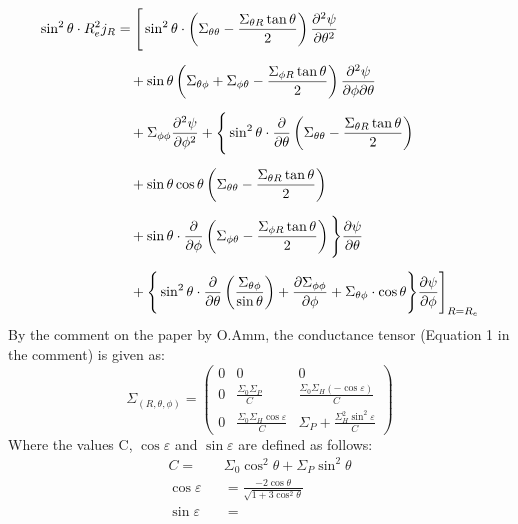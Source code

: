 \documentclass{article}
\begin{document}
\begin{equation*}
	\begin{aligned}
		\sin^2\theta \cdot R_e^2j_R
		 & =  \Bigg[
			\sin^2 \theta \cdot \left( \Sigma_{\theta\theta} - \frac{\Sigma_{\theta R} \tan\theta}{2} \right)
		\pdv[2]{\psi}{\theta}                                                         \\[6pt]
		 & \quad + \sin\theta
		\left( \Sigma_{\theta\phi} + \Sigma_{\phi\theta} - \frac{\Sigma_{\phi R} \tan\theta}{2} \right)
		\pdv{\psi}{\phi}{\theta}                                                      \\[6pt]
		 & \quad + \Sigma_{\phi\phi}
		\pdv[2]{\psi}{\phi} + \Bigg\{
		\sin^2\theta\cdot \pdv{\theta}
		\left( \Sigma_{\theta\theta} - \frac{\Sigma_{\theta R} \tan\theta}{2} \right) \\[6pt]
		 & \quad + \sin \theta\cos\theta
		\left( \Sigma_{\theta\theta} - \frac{\Sigma_{\theta R} \tan\theta}{2} \right) \\[6pt]
		 & \quad + \sin\theta\cdot
		\pdv{\phi}
		\left( \Sigma_{\phi\theta} - \frac{\Sigma_{\phi R} \tan\theta}{2} \right)
		\Bigg\}\pdv{\psi}{\theta}                                                     \\[6pt]
		 & \quad + \Bigg\{\sin^2\theta\cdot\pdv{\theta}
		\left( \frac{\Sigma_{\theta\phi}}{\sin\theta} \right) +
		\pdv{\Sigma_{\phi\phi}}{\phi}
		+ \Sigma_{\theta\phi}\cdot\cos\theta
		\Bigg\}\pdv{\psi}{\phi}
		\Bigg]_{R = R_e}
	\end{aligned}
\end{equation*}
By the comment on the paper by O.Amm, the conductance tensor (Equation 1 in the comment) is given as:
\begin{equation}
    \label{e:conductance_tensor}
	\Sigma_{(R, \theta,\phi)} = \left(\begin{matrix}
			0 & 0                                         & 0                                                \\
			0 & \frac{\Sigma_0\Sigma_P}{C}                & \frac{\Sigma_0\Sigma_H(-\cos\varepsilon)}{C}     \\
			0 & \frac{\Sigma_0\Sigma_H\cos\varepsilon}{C} & \Sigma_P + \frac{\Sigma_H^2\sin^2\varepsilon}{C}
		\end{matrix}\right)
\end{equation}
Where the values C, $\cos\varepsilon$ and $\sin\varepsilon$ are defined as follows:
\begin{align}
    \label{e:c} C=&&\Sigma_0\cos^2\theta + \Sigma_P\sin^2\theta\\
    \label{e:cos_varep} \cos\varepsilon&&= \frac{-2\cos\theta}{\sqrt{1+3\cos^2\theta}}\\
    \label{e:sin_varep}\sin\varepsilon&&= \frac{}{}
\end{align}
\end{document}
